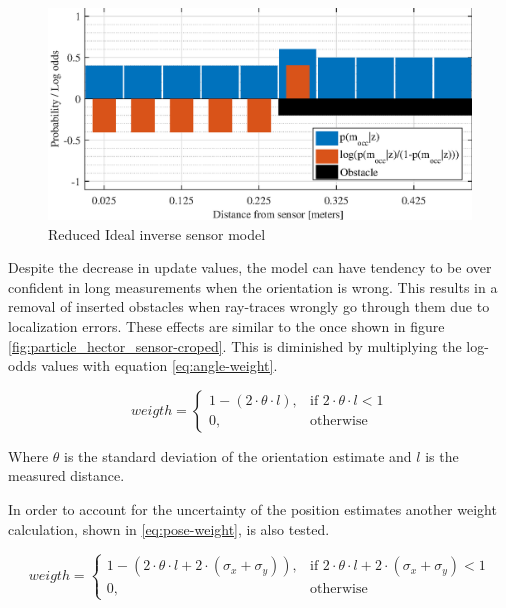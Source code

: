 \begin{figure}[htbp]
	\centering
	\includegraphics[scale=1]{figures/static_mapping/reduced_ideal_sensor_model}
	\caption{Reduced Ideal inverse sensor model}
	\label{fig:reduced_ideal_sensor_model}
\end{figure}

Despite the decrease in update values, the model can have tendency to be over confident in long measurements when the orientation is wrong.
This results in a removal of inserted obstacles when ray-traces wrongly go through them due to localization errors.
These effects are similar to the once shown in figure \ref{fig:particle_hector_sensor-croped}.
This is diminished by multiplying the log-odds values with equation \vref{eq:angle-weight}.

\begin{equation}
\label{eq:angle-weight}
weigth = 
\begin{cases}
1 - ( 2 \cdot \theta \cdot l ), & \text{if } 2 \cdot \theta \cdot l < 1\\
0, & \text{otherwise}
\end{cases}
\end{equation}

Where \(\theta \) is the standard deviation of the orientation estimate and \(l\) is the measured distance.

In order to account for the uncertainty of the position estimates another weight calculation, shown in \vref{eq:pose-weight}, is also tested.

\begin{equation}
\label{eq:pose-weight}
weigth = 
\begin{cases}
1 - ( 2 \cdot \theta \cdot l + 2 \cdot (\sigma_x + \sigma_y) ), & \text{if } 2 \cdot \theta \cdot l + 2 \cdot (\sigma_x + \sigma_y) < 1\\
0, & \text{otherwise}
\end{cases}
\end{equation}

